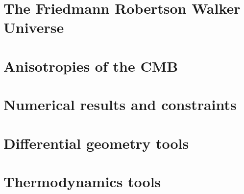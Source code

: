 \documentclass[12pt,a4paper]{book}
\begin{document}
\frontmatter 

\null\thispagestyle{empty}
\newpage

 
\tableofcontents

\mainmatter
\setlength{\parskip}{.5em} %
\chapter{The Friedmann Robertson Walker Universe}








\chapter{Anisotropies of the CMB}




\chapter{Numerical results and constraints}



\appendix
\chapter{Differential geometry tools}

\chapter{Thermodynamics tools}




 
  
\end{document}
